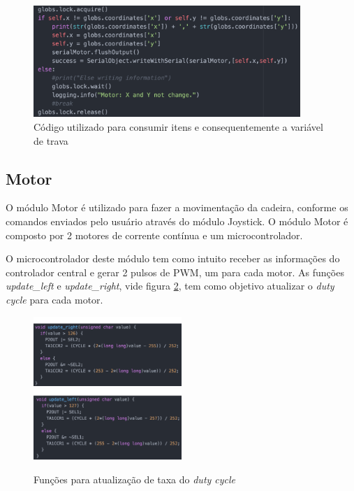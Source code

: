   \begin{figure}[!htb]
  \centering
  \includegraphics[width=0.9\textwidth]{figuras/resultados/motor_lock}
  \caption{Código utilizado para consumir itens e consequentemente a variável de trava}
  \label{fig:motor_lock}
  \end{figure}

\subsection{Motor}

    O módulo Motor é utilizado para fazer a movimentação da cadeira, conforme os comandos enviados pelo usuário através do módulo Joystick. O módulo Motor é composto por 2 motores de corrente contínua e um microcontrolador.

    O microcontrolador deste módulo tem como intuito receber as informações do controlador central e gerar 2 pulsos de PWM, um para cada motor. As funções \textit{update\_left} e \textit{update\_right}, vide figura \ref{fig:update_motors}, tem como objetivo atualizar o \textit{duty cycle} para cada motor.

    \begin{figure}[!htb]
    \centering
    \includegraphics[width = 0.5\textwidth]{figuras/resultados/update_motor_right}
    \includegraphics[width = 0.5\textwidth]{figuras/resultados/update_motor_left}
    \caption{Funções para atualização de taxa do \textit{duty cycle}}
    \label{fig:update_motors}
    \end{figure}

